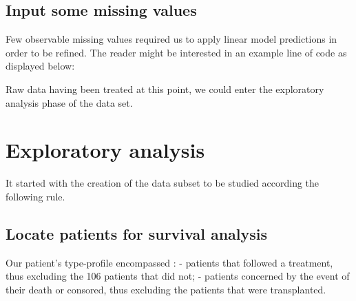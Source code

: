 \documentclass[]{article}
\newenvironment{Shaded}{\begin{snugshade}}{\end{snugshade}}
\newcommand{\KeywordTok}[1]{\textcolor[rgb]{0.13,0.29,0.53}{\textbf{#1}}}
\newcommand{\DataTypeTok}[1]{\textcolor[rgb]{0.13,0.29,0.53}{#1}}
\newcommand{\DecValTok}[1]{\textcolor[rgb]{0.00,0.00,0.81}{#1}}
\newcommand{\StringTok}[1]{\textcolor[rgb]{0.31,0.60,0.02}{#1}}
\newcommand{\CommentTok}[1]{\textcolor[rgb]{0.56,0.35,0.01}{\textit{#1}}}
\newcommand{\OperatorTok}[1]{\textcolor[rgb]{0.81,0.36,0.00}{\textbf{#1}}}
\newcommand{\NormalTok}[1]{#1}
\begin{document}
\subsection{Input some missing values}\label{input-some-missing-values}

Few observable missing values required us to apply linear model
predictions in order to be refined. The reader might be interested in an
example line of code as displayed below:

\begin{Shaded}
\end{Shaded}

Raw data having been treated at this point, we could enter the
exploratory analysis phase of the data set.

\section{Exploratory analysis}\label{exploratory-analysis}

It started with the creation of the data subset to be studied according
the following rule.

\subsection{Locate patients for survival
analysis}\label{locate-patients-for-survival-analysis}

Our patient's type-profile encompassed : - patients that followed a
treatment, thus excluding the 106 patients that did not; - patients
concerned by the event of their death or consored, thus excluding the
patients that were transplanted.

\begin{Shaded}
\end{Shaded}
\end{document}
